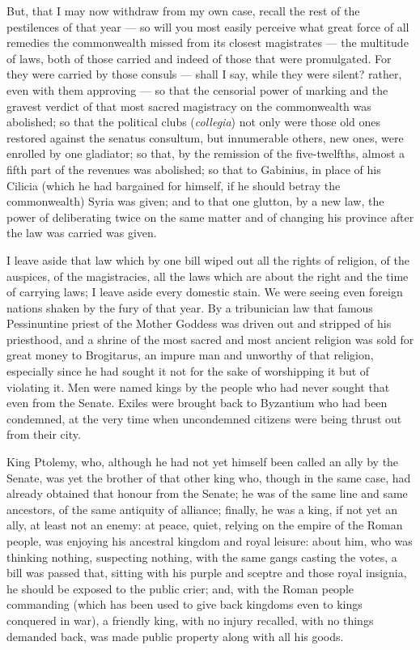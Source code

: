  But, that I may now withdraw from my own case, recall the rest of the pestilences of that year --- so will you most easily perceive what great force of all remedies the commonwealth missed from its closest magistrates --- the multitude of laws, both of those carried and indeed of those that were promulgated. For they were carried by those consuls --- shall I say, while they were silent? rather, even with them approving --- so that the censorial power of marking and the gravest verdict of that most sacred magistracy on the commonwealth was abolished; so that the political clubs (\textit{collegia}) not only were those old ones restored against the senatus consultum, but innumerable others, new ones, were enrolled by one gladiator; so that, by the remission of the five-twelfths, almost a fifth part of the revenues was abolished; so that to Gabinius, in place of his Cilicia (which he had bargained for himself, if he should betray the commonwealth) Syria was given; and to that one glutton, by a new law, the power of deliberating twice on the same matter and of changing his province after the law was carried was given.

 I leave aside that law which by one bill wiped out all the rights of religion, of the auspices, of the magistracies, all the laws which are about the right and the time of carrying laws; I leave aside every domestic stain. We were seeing even foreign nations shaken by the fury of that year. By a tribunician law that famous Pessinuntine priest of the Mother Goddess was driven out and stripped of his priesthood, and a shrine of the most sacred and most ancient religion was sold for great money to Brogitarus, an impure man and unworthy of that religion, especially since he had sought it not for the sake of worshipping it but of violating it. Men were named kings by the people who had never sought that even from the Senate. Exiles were brought back to Byzantium who had been condemned, at the very time when uncondemned citizens were being thrust out from their city.

 King Ptolemy, who, although he had not yet himself been called an ally by the Senate, was yet the brother of that other king who, though in the same case, had already obtained that honour from the Senate; he was of the same line and same ancestors, of the same antiquity of alliance; finally, he was a king, if not yet an ally, at least not an enemy: at peace, quiet, relying on the empire of the Roman people, was enjoying his ancestral kingdom and royal leisure: about him, who was thinking nothing, suspecting nothing, with the same gangs casting the votes, a bill was passed that, sitting with his purple and sceptre and those royal insignia, he should be exposed to the public crier; and, with the Roman people commanding (which has been used to give back kingdoms even to kings conquered in war), a friendly king, with no injury recalled, with no things demanded back, was made public property along with all his goods.

